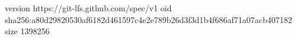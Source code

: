 version https://git-lfs.github.com/spec/v1
oid sha256:a80d29820530af6182d461597c4e2e789b26d3f3d1b4f686af71a07acb407182
size 1398256
